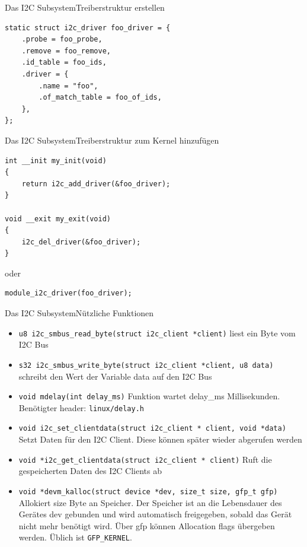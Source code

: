 \documentclass[aspectratio=169]{beamer}
\begin{document}
\begin{frame}[fragile]{Das I2C Subsystem}{Treiberstruktur erstellen}
	\begin{lstlisting}
static struct i2c_driver foo_driver = {
	.probe = foo_probe,
	.remove = foo_remove,
	.id_table = foo_ids,
	.driver = {
		.name = "foo",
		.of_match_table = foo_of_ids,
	},
};
	\end{lstlisting}
\end{frame}

\begin{frame}[fragile]{Das I2C Subsystem}{Treiberstruktur zum Kernel hinzufügen}
	\begin{lstlisting}
int __init my_init(void)
{
	return i2c_add_driver(&foo_driver);
}

void __exit my_exit(void)
{
	i2c_del_driver(&foo_driver);
}

	\end{lstlisting}
	\begin{center}
		oder
	\end{center}
	\begin{lstlisting}
module_i2c_driver(foo_driver);
	\end{lstlisting}
\end{frame}

\begin{frame}[fragile]{Das I2C Subsystem}{Nützliche Funktionen}
	\begin{itemize}
		\item \lstinline|u8 i2c_smbus_read_byte(struct i2c_client *client)| liest ein Byte vom I2C Bus
		\item \lstinline|s32 i2c_smbus_write_byte(struct i2c_client *client, u8 data)| schreibt den Wert der Variable data auf den I2C Bus
		\item \lstinline|void mdelay(int delay_ms)| Funktion wartet delay\_ms Millisekunden. Benötigter header: \lstinline|linux/delay.h|
		\item \lstinline|void i2c_set_clientdata(struct i2c_client * client, void *data)| Setzt Daten für den I2C Client. Diese können später wieder abgerufen werden
		\item \lstinline|void *i2c_get_clientdata(struct i2c_client * client)| Ruft die gespeicherten Daten des I2C Clients ab
		\item \lstinline|void *devm_kalloc(struct device *dev, size_t size, gfp_t gfp)| Allokiert size Byte an Speicher. Der Speicher ist an die Lebensdauer des Gerätes dev gebunden und wird automatisch freigegeben, sobald das Gerät nicht mehr benötigt wird. Über gfp können Allocation flags übergeben werden. Üblich ist \lstinline|GFP_KERNEL|.
	\end{itemize}
\end{frame}
\end{document}

